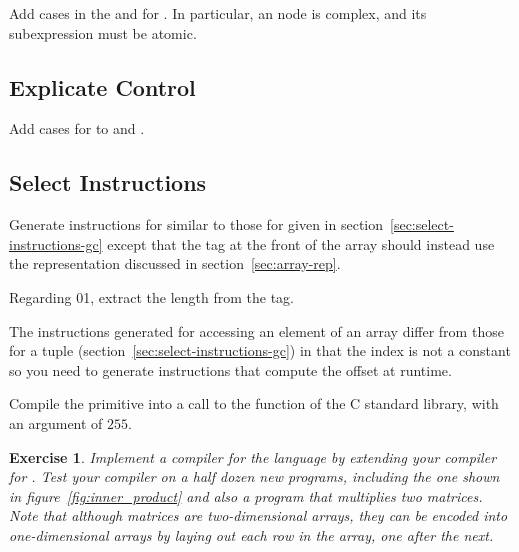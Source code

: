 \documentclass[7x10]{TimesAPriori_MIT}%
\def\racketEd{0}
\def\pythonEd{1}
\providecommand{\BookEdition}{1}
\let\edition\BookEdition
\newcommand{\racket}[1]{{\if\edition\racketEd{#1}\fi}}
\newcommand{\pythonColor}[0]{}
\newcommand{\python}[1]{{\if\edition\pythonEd\pythonColor #1\fi}}
\newtheorem{exercise}[theorem]{Exercise}
\numberwithin{theorem}{chapter}
\numberwithin{definition}{chapter}
\numberwithin{equation}{chapter}
\begin{document}
Add cases in the  and  for
. In particular, an  node is
complex, and its subexpression must be atomic.

\subsection{Explicate Control}

Add cases for  to  and
.

\subsection{Select Instructions}

Generate instructions for  similar to those for
 given in section~\ref{sec:select-instructions-gc}
except that the tag at the front of the array should instead use the
representation discussed in section~\ref{sec:array-rep}.

Regarding \racket{}\python{},
extract the length from the tag.

The instructions generated for accessing an element of an array differ
from those for a tuple (section~\ref{sec:select-instructions-gc}) in
that the index is not a constant so you need to generate instructions
that compute the offset at runtime.

Compile the  primitive into a call to the 
function of the C standard library, with an argument of $255$.



\begin{exercise}\normalfont\normalsize

Implement a compiler for the \LangArray{} language by extending your
compiler for \LangLoop{}. Test your compiler on a half dozen new
programs, including the one shown in figure~\ref{fig:inner_product}
and also a program that multiplies two matrices. Note that although
matrices are two-dimensional arrays, they can be encoded into
one-dimensional arrays by laying out each row in the array, one after
the next.
  
\end{exercise}
\end{document}
